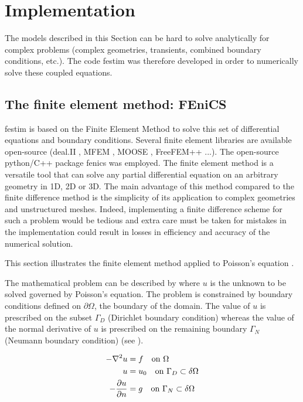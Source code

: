 \section{Implementation}


The models described in this Section can be hard to solve analytically for complex problems (complex geometries, transients, combined boundary conditions, etc.).
The code \gls{festim}  was therefore developed in order to numerically solve these coupled equations.

\subsection{The finite element method: FEniCS}
\gls{festim} is based on the Finite Element Method to solve this set of differential equations and boundary conditions.
Several finite element libraries are available open-source (deal.II , MFEM , MOOSE , FreeFEM++ ...).
The open-source python/C++ package \gls{fenics}  was employed.
The finite element method is a versatile tool that can solve any partial differential equation on an arbitrary geometry in 1D, 2D or 3D.
The main advantage of this method compared to the finite difference method is the simplicity of its application to complex geometries and unstructured meshes.
Indeed, implementing a finite difference scheme for such a problem would be tedious and extra care must be taken for mistakes in the implementation could result in losses in efficiency and accuracy of the numerical solution.

This section illustrates the finite element method applied to Poisson's equation .

The mathematical problem can be described by  where $u$ is the unknown to be solved governed by Poisson's equation.
The problem is constrained by boundary conditions defined on $\partial \Omega$, the boundary of the domain.
The value of $u$ is prescribed on the subset $\Gamma_D$ (Dirichlet boundary condition) whereas the value of the normal derivative of $u$ is prescribed on the remaining boundary $\Gamma_N$ (Neumann boundary condition) (see ).

\begin{subequations}
    \begin{align}
        -\nabla^2 u &= f \quad \text{on    } \Omega \\
        u &= u_0 \quad \text{on    } \Gamma_D  \subset \delta \Omega \\
        -\frac{\partial u}{\partial n} &= g \quad \text{on    } \Gamma_N  \subset \delta \Omega
    \end{align}
    \labeq{example poisson}
\end{subequations}


